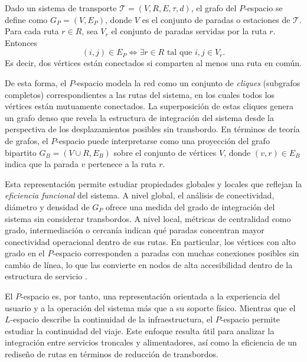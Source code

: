                                 \begin{definicion}[$P$-espacio]
                                    Dado un sistema de transporte $\mathcal{T} = (V, R, E, \tau, d)$, el grafo del $P$-espacio se define como $G_P=(V,E_P)$, donde $V$ es el conjunto de paradas o estaciones de $\mathcal{T}$. Para cada ruta $r \in R$, sea $V_r$ el conjunto de paradas servidas por la ruta $r$. Entonces
                                    $$
                                        (i,j)\in E_P \iff \exists r\in R \text{ tal que } i,j\in V_r.
                                    $$
                                    Es decir, dos vértices están conectados si comparten al menos una ruta en común.
                                \end{definicion}
                De esta forma, el $P$-espacio modela la red como un conjunto de \textit{cliques} (subgrafos completos) correspondientes a las rutas del sistema, en los cuales todos los vértices están mutuamente conectados. La superposición de estas cliques genera un grafo denso que revela la estructura de integración del sistema desde la perspectiva de los desplazamientos posibles sin transbordo. En términos de teoría de grafos, el $P$-espacio puede interpretarse como una proyección del grafo bipartito $G_B=(V\cup R,E_B)$ sobre el conjunto de vértices $V$, donde $(v,r)\in E_B$ indica que la parada $v$ pertenece a la ruta $r$.

                Esta representación permite estudiar propiedades globales y locales que reflejan la \textit{eficiencia funcional} del sistema. A nivel global, el análisis de conectividad, diámetro y densidad de $G_P$ ofrece una medida del grado de integración del sistema sin considerar transbordos. A nivel local, métricas de centralidad como grado, intermediación o cercanía indican qué paradas concentran mayor conectividad operacional dentro de sus rutas. En particular, los vértices con alto grado en el $P$-espacio corresponden a paradas con muchas conexiones posibles sin cambio de línea, lo que las convierte en nodos de alta accesibilidad dentro de la estructura de servicio \cite{dingluo2019}.

                El $P$-espacio es, por tanto, una representación orientada a la experiencia del usuario y a la operación del sistema más que a su soporte físico. Mientras que el $L$-espacio describe la continuidad de la infraestructura, el $P$-espacio permite estudiar la continuidad del viaje. Este enfoque resulta útil para analizar la integración entre servicios troncales y alimentadores, así como la eficiencia de un rediseño de rutas en términos de reducción de transbordos.

